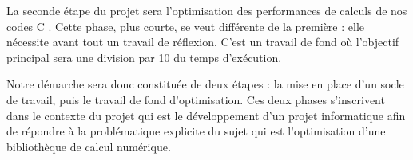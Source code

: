 La seconde \'etape du projet sera l'optimisation des performances de calculs de nos codes C . Cette phase, plus courte, se veut diff\'erente de la 
premi\`ere : elle n\'ecessite avant tout un travail de r\'eflexion. C'est  un travail de fond o\`u l'objectif principal sera une division par 10 du temps
 d'ex\'ecution. 

Notre d\'emarche sera donc constitu\'ee de deux \'etapes : la mise en place d'un socle de travail, puis le travail de fond d'optimisation. Ces deux phases 
s'inscrivent dans le contexte du projet qui est le d\'eveloppement d'un projet informatique afin de r\'epondre \`a la probl\'ematique explicite du sujet 
qui est l'optimisation d'une biblioth\`eque de calcul num\'erique.


